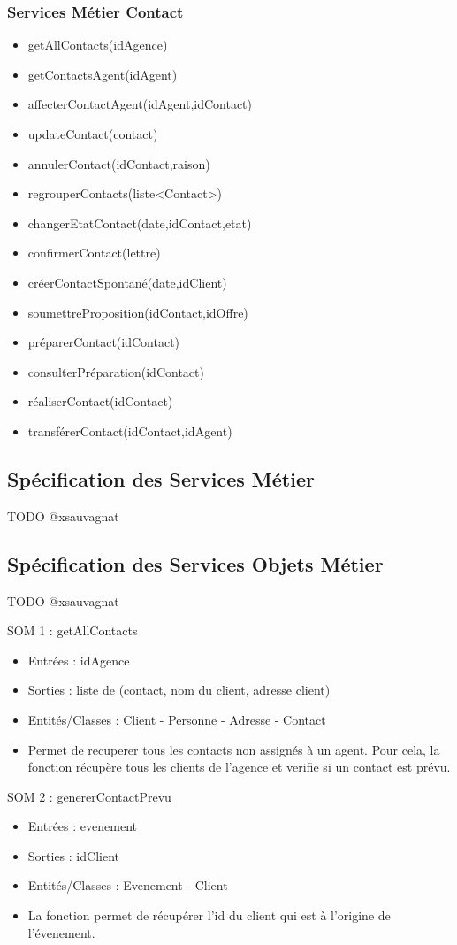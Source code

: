 \subsubsection{Services Métier Contact}

\begin{itemize}
\item getAllContacts(idAgence)
\item getContactsAgent(idAgent)
\item affecterContactAgent(idAgent,idContact)
\item updateContact(contact)
\item annulerContact(idContact,raison)
\item regrouperContacts(liste<Contact>)
\item changerEtatContact(date,idContact,etat)
\item confirmerContact(lettre)
\item créerContactSpontané(date,idClient)
\item soumettreProposition(idContact,idOffre)
\item préparerContact(idContact)
\item consulterPréparation(idContact)
\item réaliserContact(idContact)
\item transférerContact(idContact,idAgent)
\end{itemize}

\subsection{Spécification des Services Métier}

TODO @xsauvagnat

\subsection{Spécification des Services Objets Métier}

TODO @xsauvagnat

SOM 1 : getAllContacts
\begin{itemize}
\item Entrées : idAgence
\item Sorties : liste de (contact, nom du client, adresse client)
\item Entités/Classes : Client - Personne - Adresse - Contact
\item Permet de recuperer tous les contacts non assignés à un agent. Pour cela, la fonction récupère tous les clients de l'agence et verifie si un contact est prévu. 
\end{itemize}

SOM 2 : genererContactPrevu
\begin{itemize}
\item Entrées : evenement
\item Sorties : idClient
\item Entités/Classes : Evenement - Client
\item La fonction permet de récupérer l'id du client qui est à l'origine de l'évenement.
\end{itemize}
